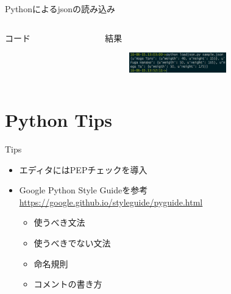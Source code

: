 \documentclass[12pt, dvipdfmx]{beamer}
\begin{document}
\begin{frame}{Pythonによるjsonの読み込み}
    \begin{columns}[t]
        \begin{column}{0.5\textwidth}
            \begin{block}{コード}
                \loadjsonpython
            \end{block}
        \end{column}
        \begin{column}{0.5\textwidth}
            \begin{block}{結果}
                \begin{figure}[h]
                    \centering
                    \includegraphics[width=4.2cm]{img/load_json_result.png}
                \end{figure}
            \end{block}
        \end{column}
    \end{columns}
\end{frame}

\section{Python Tips}
\begin{frame}{Tips}
    \begin{itemize}
        \item エディタにはPEPチェックを導入
        \item Google Python Style Guideを参考\\
            \url{https://google.github.io/styleguide/pyguide.html}
        \begin{itemize}
            \item 使うべき文法
            \item 使うべきでない文法
            \item 命名規則
            \item コメントの書き方
        \end{itemize}
    \end{itemize}
\end{frame}
\end{document}
